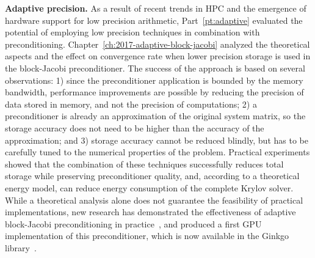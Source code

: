 \noindent\textbf{Adaptive precision.}
As a result of recent trends in HPC and the emergence of hardware support for
low precision arithmetic, Part~\ref{pt:adaptive} evaluated the potential of
employing low precision techniques in combination with preconditioning.
Chapter~\ref{ch:2017-adaptive-block-jacobi} analyzed the theoretical aspects and
the effect on convergence rate when lower precision storage is used in the
block-Jacobi preconditioner. The success of the approach is based on
several observations: 1) since the preconditioner application is bounded by the
memory bandwidth, performance improvements are possible by reducing the
precision of data stored in memory, and not the precision of computations; 2) a
preconditioner is already an approximation of the original system matrix, so the
storage accuracy does not need to be higher than the accuracy of the
approximation; and 3) storage accuracy cannot be reduced blindly, but has to be
carefully tuned to the numerical properties of the problem. Practical
experiments showed that the combination of these techniques successfully reduces
total storage while preserving preconditioner quality, and, according to a
theoretical energy model, can reduce energy consumption of the complete Krylov
solver. While a theoretical analysis alone does not guarantee the feasibility of
practical implementations, new research has demonstrated the effectiveness of
adaptive block-Jacobi preconditioning in practice~\cite{adaptive-jacobi-gpu},
and produced a first GPU implementation of this preconditioner, which is now
available in the Ginkgo library~\cite{ginkgo}.

